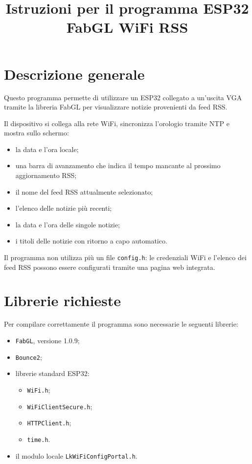 \documentclass[11pt,a4paper]{article}
\title{Istruzioni per il programma ESP32 FabGL WiFi RSS}
\author{}
\date{}
\begin{document}
	
	\maketitle
	
	\section{Descrizione generale}
	
	Questo programma permette di utilizzare un ESP32 collegato a un'uscita VGA tramite la libreria FabGL per visualizzare notizie provenienti da feed RSS.
	
	Il dispositivo si collega alla rete WiFi, sincronizza l'orologio tramite NTP e mostra sullo schermo:
	
	\begin{itemize}
		\item la data e l'ora locale;
		\item una barra di avanzamento che indica il tempo mancante al prossimo aggiornamento RSS;
		\item il nome del feed RSS attualmente selezionato;
		\item l'elenco delle notizie più recenti;
		\item la data e l'ora delle singole notizie;
		\item i titoli delle notizie con ritorno a capo automatico.
	\end{itemize}
	
	Il programma non utilizza più un file \texttt{config.h}: le credenziali WiFi e l'elenco dei feed RSS possono essere configurati tramite una pagina web integrata.
	
	\section{Librerie richieste}
	
	Per compilare correttamente il programma sono necessarie le seguenti librerie:
	
	\begin{itemize}
		\item \texttt{FabGL}, versione 1.0.9;
		\item \texttt{Bounce2};
		\item librerie standard ESP32:
		\begin{itemize}
			\item \texttt{WiFi.h};
			\item \texttt{WiFiClientSecure.h};
			\item \texttt{HTTPClient.h};
			\item \texttt{time.h}.
		\end{itemize}
		\item il modulo locale \texttt{LkWiFiConfigPortal.h}.
	\end{itemize}
	
\end{document}
